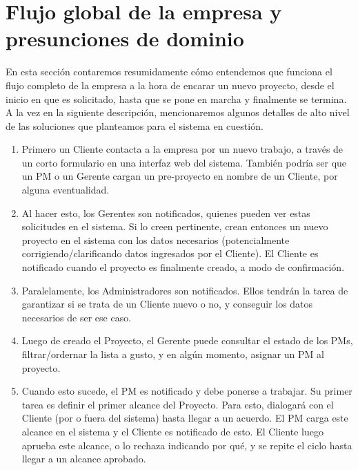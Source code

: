 \section{Flujo global de la empresa y presunciones de dominio}

En esta sección contaremos resumidamente cómo entendemos que funciona 
el flujo completo de la empresa a la hora de encarar un nuevo proyecto, 
desde el inicio en que es solicitado, hasta que se pone en marcha y finalmente 
se termina. A la vez en la siguiente descripción, mencionaremos algunos detalles 
de alto nivel de las soluciones que planteamos para el sistema en cuestión. 

\begin{enumerate}
    \item Primero un Cliente contacta a la empresa por un nuevo trabajo, 
    a través de un corto formulario en una interfaz web del sistema. 
    También podría ser que un PM o un Gerente cargan un pre-proyecto en nombre 
    de un Cliente, por alguna eventualidad. 
    
    \item Al hacer esto, los Gerentes son notificados, quienes pueden ver 
    estas solicitudes en el sistema. Si lo creen pertinente, crean entonces 
    un nuevo proyecto en el sistema con los datos necesarios (potencialmente 
    corrigiendo/clarificando datos ingresados por el Cliente). El Cliente 
    es notificado cuando el proyecto es finalmente creado, a modo de confirmación. 
    
    \item Paralelamente, los Administradores son notificados. Ellos tendrán la 
    tarea de garantizar si se trata de un Cliente nuevo o no, y conseguir los 
    datos necesarios de ser ese caso. 
    
    \item Luego de creado el Proyecto, el Gerente puede consultar el estado 
    de los PMs, filtrar/ordernar la lista a gusto, y en algún momento, 
    asignar un PM al proyecto. 
    
    \item Cuando esto sucede, el PM es notificado y debe ponerse a trabajar. 
    Su primer tarea es definir el primer alcance del Proyecto. Para esto, 
    dialogará con el Cliente (por o fuera del sistema) hasta llegar a un acuerdo. 
    El PM carga este alcance en el sistema y el Cliente es notificado de esto. 
    El Cliente luego aprueba este alcance, o lo rechaza indicando por qué, y 
    se repite el ciclo hasta llegar a un alcance aprobado. 
    

\end{enumerate}
